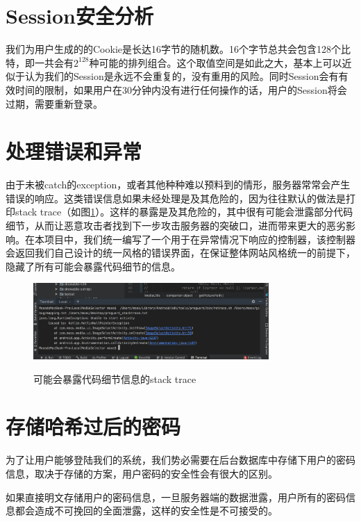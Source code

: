 \section{Session安全分析}\label{sec:sessionS}

我们为用户生成的的Cookie是长达16字节的随机数。16个字节总共会包含128个比特，即一共会有$2^{128}$种可能的排列组合。这个取值空间是如此之大，基本上可以近似于认为我们的Session是永远不会重复的，没有重用的风险。同时Session会有有效时间的限制，如果用户在30分钟内没有进行任何操作的话，用户的Session将会过期，需要重新登录。

\section{处理错误和异常}

由于未被catch的exception，或者其他种种难以预料到的情形，服务器常常会产生错误的响应。这类错误信息如果未经处理是及其危险的，因为往往默认的做法是打印stack trace（如图\ref{fig:stacktrace}）。这样的暴露是及其危险的，其中很有可能会泄露部分代码细节，从而让恶意攻击者找到下一步攻击服务器的突破口，进而带来更大的恶劣影响。在本项目中，我们统一编写了一个用于在异常情况下响应的控制器，该控制器会返回我们自己设计的统一风格的错误界面，在保证整体网站风格统一的前提下，隐藏了所有可能会暴露代码细节的信息。

\begin{figure}[!htb]
	\centering
	\includegraphics[width=0.8\textwidth]
	{figures/stacktrace.jpg}\\
	\caption{可能会暴露代码细节信息的stack trace}
	\label{fig:stacktrace}
\end{figure}

\section{存储哈希过后的密码}\label{sec:hashpassword}

为了让用户能够登陆我们的系统，我们势必需要在后台数据库中存储下用户的密码信息，取决于存储的方案，用户密码的安全性会有很大的区别。

如果直接明文存储用户的密码信息，一旦服务器端的数据泄露，用户所有的密码信息都会造成不可挽回的全面泄露，这样的安全性是不可接受的。

